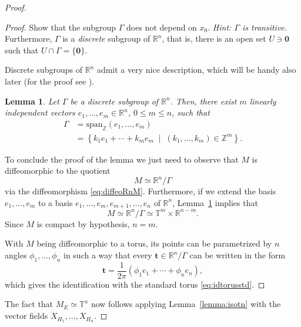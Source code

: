 \documentclass[english,fontsize=11pt,paper=a5,oneside]{scrbook}
\newcommand{\Z}{\mathbb{Z}}
\newcommand{\R}{\mathbb{R}}
\newcommand{\T}{\mathbb{T}}
\newtheorem{lemma}[theorem]{Lemma}
\theoremstyle{definition}
\newenvironment{exercise}
  {\pushQED{\qed}\renewcommand{\qedsymbol}{$\maltese$}\exercisex}
  {\popQED\endexercisex}
\begin{document}
\begin{proof}
\begin{proof}
    \begin{exercise}
      Show that the subgroup $\Gamma$ does not depend on $x_0$. \textit{Hint: $\Gamma$ is transitive.}
      Furthermore, $\Gamma$ is a \emph{discrete} subgroup of $\R^n$, that is, there is an open set $U \ni \bm 0$ such that $U\cap\Gamma = \{\bm 0\}$.
    \end{exercise}

    Discrete subgroups of $\R^n$ admit a very nice description, which will be handy also later (for the proof see \cite[Lemma 13.4]{book:knauf}).

    \begin{lemma}
      \label{lem:reprTm}
      Let $\Gamma$ be a discrete subgroup of $\R^n$. Then, there exist $m$ linearly independent vectors $e_1, \ldots, e_m \in \R^n$, $0\leq m \leq n$, such that
      \begin{align}
        \Gamma & = \mathrm{span}_{\Z}(e_1, \ldots, e_m) \\
               & = \left\{
        k_1 e_1 + \cdots + k_m e_m \;\mid\; (k_1, \ldots, k_m)\in\Z^m
        \right\}.
      \end{align}
    \end{lemma}

    To conclude the proof of the lemma we just need to observe that $M$ is diffeomorphic to the quotient
    \begin{equation}
      M \simeq \R^n / \Gamma
    \end{equation}
    via the diffeomorphism \eqref{eq:diffeoRnM}. Furthermore, if we extend the basis $e_1, \ldots, e_m$ to a basis $e_1, \ldots, e_m, e_{m+1}, \ldots,e_n$ of $\R^n$, Lemma~\ref{lem:reprTm} implies that
    \begin{equation}
      M \simeq \R^n / \Gamma \simeq \T^m \times \R^{n-m}.
    \end{equation}
    Since $M$ is compact by hypothesis, $n=m$.

    With $M$ being diffeomorphic to a torus, its points can be parametrized by $n$ angles $\phi_1, \ldots, \phi_n$ in such a way that every $\bm t \in \R^n/\Gamma$ can be written in the form
    \begin{equation}
      \bm t = \frac 1{2\pi}(\phi_1 e_1 + \cdots + \phi_n e_n),
    \end{equation}
    which gives the identification with the standard torus \eqref{eq:idtorusstd}.
  \end{proof}

  The fact that $M_E\simeq \T^n$ now follows applying Lemma~\ref{lemma:isotn} with the vector fields $X_{H_1}, \ldots, X_{H_n}$.


\end{proof}
\end{document}
